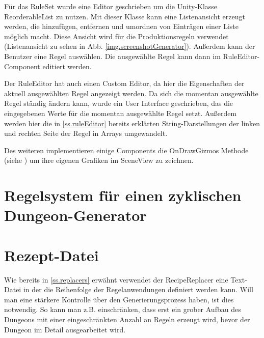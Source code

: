 Für das RuleSet wurde eine Editor geschrieben um die Unity-Klasse ReorderableList zu nutzen. Mit dieser Klasse kann eine Listenansicht erzeugt werden, die hinzufügen, entfernen und umordnen von Einträgen einer Liste möglich macht. Diese Ansicht wird für die Produktionsregeln verwendet (Listenansicht zu sehen in Abb. \ref{img.screenshotGenerator}). Außerdem kann der Benutzer eine Regel auswählen. Die ausgewählte Regel kann dann im RuleEditor-Component editiert werden.

Der RuleEditor hat auch einen Custom Editor, da hier die Eigenschaften der aktuell ausgewählten Regel angezeigt werden. Da sich die momentan ausgewählte Regel ständig ändern kann, wurde ein User Interface geschrieben, das die eingegebenen Werte für die momentan ausgewählte Regel setzt. Außerdem werden hier die in \ref{ss.ruleEditor} bereits erklärten String-Darstellungen der linken und rechten Seite der Regel in Arrays umgewandelt.

Des weiteren implementieren einige Components die OnDrawGizmos Methode (siehe \cite[Seite: MonoBehaviour.OnDrawGizmos]{unitySciptingReference}) um ihre eigenen Grafiken im SceneView zu zeichnen. 


\section{Regelsystem für einen zyklischen Dungeon-Generator}\label{s.regelsystem}


\section{Rezept-Datei}\label{s.rezeptDatei}

Wie bereits in \ref{ss.replacers} erwähnt verwendet der RecipeReplacer eine Text-Datei in der die Reihenfolge der Regelanwendungen definiert werden kann. Will man eine stärkere Kontrolle über den Generierungsprozess haben, ist dies notwendig. So kann man z.B. einschränken, dass erst ein grober Aufbau des Dungeons mit einer eingeschränkten Anzahl an Regeln erzeugt wird, bevor der Dungeon im Detail ausgearbeitet wird.

